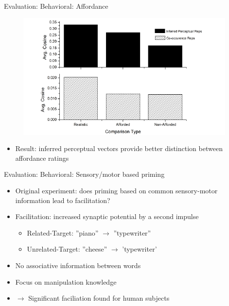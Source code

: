 \documentclass[12pt,a4paper]{beamer}
\begin{document}
\begin{frame}{Evaluation: Behavioral: Affordance}
\begin{figure}
\includegraphics[scale=0.7]{figure_3_affordance_distinction.png}
\end{figure}
\begin{itemize}
\item Result: inferred perceptual vectors provide better distinction between affordance ratings
\end{itemize}
\end{frame}






\begin{frame}{Evaluation: Behavioral: Sensory/motor based priming}
\begin{itemize}
\item Original experiment: does priming based on common sensory-motor information lead to facilitation?
\item Facilitation: increased synaptic potential by a second impulse
    \begin{itemize}
    \item Related-Target: ''piano'' $\to$ ''typewriter''
    \item Unrelated-Target: ''cheese'' $\to$ 'typewriter'
    \end{itemize}
\item No associative information between words
\item Focus on manipulation knowledge
\item $\to$ Significant faciliation found for human subjects
\end{itemize}
\end{frame}
\end{document}
